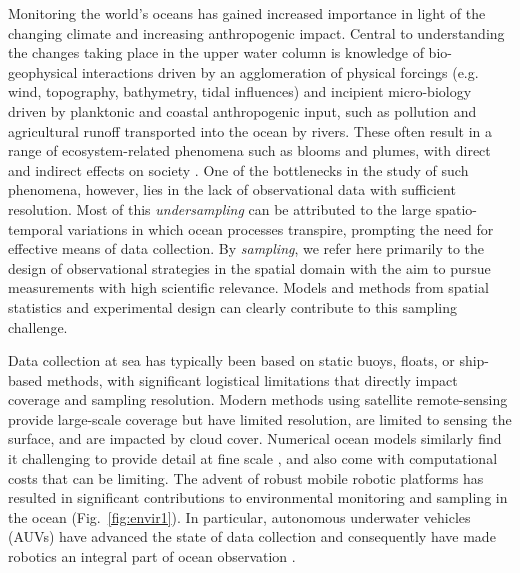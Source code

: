 \documentclass[aoas]{imsart}
\begin{document}
Monitoring the world's oceans has gained increased importance in light
of the changing climate and increasing anthropogenic impact. Central
to understanding the changes taking place in the upper water column is
knowledge of bio-geophysical interactions driven by an
agglomeration of physical forcings (e.g. wind, topography, bathymetry,
tidal influences) and incipient micro-biology driven by
planktonic and coastal anthropogenic input, such as pollution and
agricultural runoff transported into the ocean by rivers.  These often
result in a range of ecosystem-related phenomena such as blooms and
plumes, with direct and indirect effects on society \citep{ryan2017}. One of the
bottlenecks in the study of such phenomena, however, lies in the lack of
observational data with sufficient resolution. Most of this
\emph{undersampling} can be attributed to the large spatio-temporal
variations in which ocean processes transpire, prompting the need for
effective means of data collection.  By \emph{sampling}, we refer here
primarily to the design of observational strategies in the spatial
domain with the aim to pursue measurements with high scientific
relevance. Models and methods from spatial statistics and experimental design can clearly contribute to this sampling challenge.

 
Data collection at sea has typically been based on static buoys,
floats, or ship-based methods, with significant logistical limitations
that directly impact coverage and sampling resolution. Modern methods
using satellite remote-sensing provide large-scale coverage but have
limited resolution, are limited to sensing the surface, and are
impacted by cloud cover. Numerical ocean models similarly find it
challenging to provide detail at fine scale \citep{Lermusiaux:2006},
and also come with computational costs that can be limiting. The
advent of robust mobile robotic platforms \citep{Bellingham07} has
resulted in significant contributions to environmental monitoring and
sampling in the ocean (Fig.~\ref{fig:envir1}). In particular,
autonomous underwater vehicles (AUVs) have advanced the state of data
collection and consequently have made robotics an integral part of
ocean observation \citep{das11b,Das2015,fossuminformation,fossum18b}.
\end{document}
